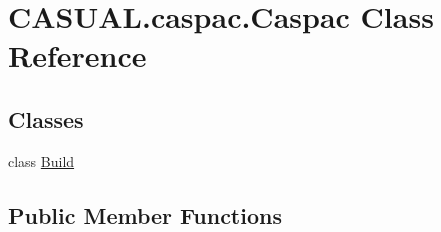 \hypertarget{class_c_a_s_u_a_l_1_1caspac_1_1_caspac}{\section{C\-A\-S\-U\-A\-L.\-caspac.\-Caspac Class Reference}
\label{class_c_a_s_u_a_l_1_1caspac_1_1_caspac}
}
\subsection*{Classes}
\begin{DoxyCompactItemize}
\item 
class \hyperlink{class_c_a_s_u_a_l_1_1caspac_1_1_caspac_1_1_build}{Build}
\end{DoxyCompactItemize}
\subsection*{Public Member Functions}
